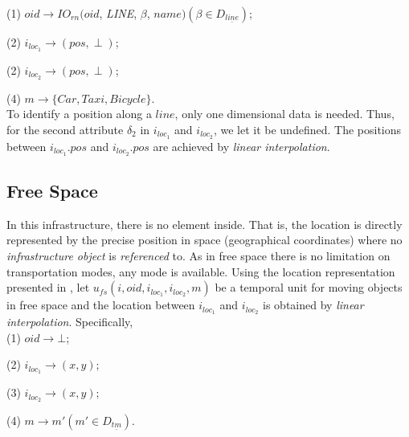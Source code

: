(1) $oid \rightarrow IO_{rn}(oid$, \textit{LINE}, $\beta$, $name)(\beta \in D_{\underline{line}})$; 

(2) $i_{loc_1} \rightarrow (pos,\perp)$;

(2) $i_{loc_2} \rightarrow (pos,\perp)$;

(4) $m\rightarrow \{Car,Taxi, Bicycle\}$.  \\

To identify a position along a $line$, only one dimensional data is needed. 
Thus, for the second attribute $\delta_2$ in $i_{loc_1}$ and $i_{loc_2}$, 
we let it be undefined. The positions between $i_{loc_1}.pos$ and $i_{loc_2}.pos$ are achieved by \textit{linear interpolation}. 

\subsection{Free Space}
\label{sec:freespace}
In this infrastructure, there is no element inside. That is, the location is directly
represented by the precise position in space (geographical coordinates) where no 
\textit{infrastructure object} is \textit{referenced} to. As in free space there is no limitation on transportation modes, any mode is available. Using the location representation presented in \cite{FG+00,GBE+00}, let $u_{fs}(i,oid,i_{loc_1},i_{loc_2},m)$ be a temporal unit for moving objects in free space and the location between $i_{loc_1}$ and $i_{loc_2}$ is obtained by \textit{linear interpolation}. Specifically, \\

(1) $oid \rightarrow \bot$; 

(2) $i_{loc_1} \rightarrow (x,y)$;

(3) $i_{loc_2} \rightarrow (x,y)$;

(4) $m\rightarrow m' (m' \in D_{\underline{tm}})$.
